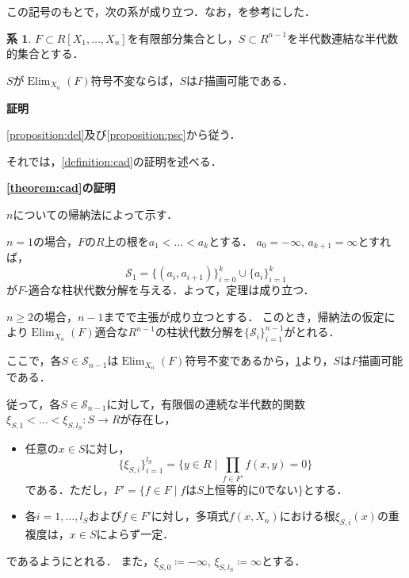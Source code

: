 \documentclass[uplatex, dvipdfmx]{jsarticle}
\makeatletter
\numberwithin{equation}{section}
\renewenvironment{proof}[1][\proofname]{\par
  \pushQED{\qed}%
  \normalfont \topsep6\p@\@plus6\p@\relax
  \trivlist
  \item\relax
  {\bfseries
  #1\@addpunct{.}}\hspace\labelsep\ignorespaces
}{
  \popQED\endtrivlist\@endpefalse
}
\newcommand{\calS}{\mathcal{S}}
\newcommand{\map}[3]{{#1}\colon{#2}\rightarrow{#3}}
\DeclareMathOperator{\Elim}{Elim}
\theoremstyle{definition}
\newtheorem{corollary}[definition]{系}
\renewcommand{\proofname}{\textbf{証明}}
\makeatother
\begin{document}
この記号のもとで，次の系が成り立つ．なお，\cite[Theorem 5.16.]{MR2248869}を参考にした．

\begin{corollary}\label{corollary:inv-deline}
$F \subset R[X_1, \dots, X_n]$を有限部分集合とし，$S \subset R^{n-1}$を半代数連結な半代数的集合とする．

$S$が$\Elim_{X_n}(F)$符号不変ならば，$S$は$F$描画可能である．
\end{corollary}

\begin{proof}
\cref{proposition:del}及び\cref{proposition:psc}から従う．
\end{proof}

それでは，\cref{definition:cad}の証明を述べる．

\begin{proof}[\cref{theorem:cad}の証明]
     $n$についての帰納法によって示す．

     $n=1$の場合，$F$の$R$上の根を$a_1 < \dots < a_k$とする．
     $a_0 = -\infty$, $a_{k+1} = \infty$とすれば，
     \begin{equation}
          \calS_1 = \{(a_i, a_{i+1})\}_{i=0}^k \cup \{a_i\}_{i=1}^k
     \end{equation}
     が$F$-適合な柱状代数分解を与える．よって，定理は成り立つ．

     $n\geq 2$の場合，$n-1$までで主張が成り立つとする．
     このとき，帰納法の仮定により$\Elim_{X_n}(F)$適合な$R^{n-1}$の柱状代数分解を$\{\calS_i\}_{i=1}^{n-1}$がとれる．

     ここで，各$S \in \calS_{n-1}$は$\Elim_{X_n}(F)$符号不変であるから，\cref{corollary:inv-deline}より，$S$は$F$描画可能である．

     従って，各$S \in \calS_{n-1}$に対して，有限個の連続な半代数的関数$\map{\xi_{S,1}< \dots < \xi_{S,l_S}}{S}{R}$が存在し，
     \begin{itemize}
          \item 任意の$ x \in S $に対し，
          \begin{equation}
               \{\xi_{S,i}\}_{i=1}^{l_S} = \{y \in R \mid \prod_{f \in F'}f(x,y)=0\}
          \end{equation}
          である．ただし，$F' = \{f \in F \mid \text{$f$は$S$上恒等的に0でない}\}$とする．
          \item 各$i=1, \dots, l_S$および$f \in F'$に対し，多項式$f(x,X_n)$における根$\xi_{S,i}(x)$の重複度は，$x\in S$によらず一定．
     \end{itemize}
     であるようにとれる．
     また，$\xi_{S,0} \coloneqq -\infty$, $\xi_{S,l_S} \coloneqq \infty$とする．


\end{proof}
\end{document}
